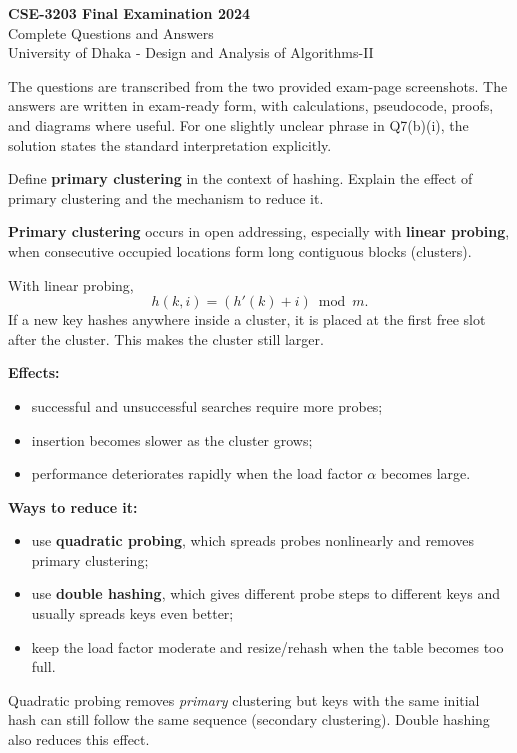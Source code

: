 \documentclass[11pt,a4paper]{article}
\begin{document}
\begin{center}
{\Huge\bfseries\color{primary} CSE-3203 Final Examination 2024}\\[0.25em]
{\Large\color{deepnavy} Complete Questions and Answers}\\[0.25em]
{\small University of Dhaka - Design and Analysis of Algorithms-II}
\end{center}

\begin{pointbox}
The questions are transcribed from the two provided exam-page screenshots. The answers are written in exam-ready form, with calculations, pseudocode, proofs, and diagrams where useful. For one slightly unclear phrase in Q7(b)(i), the solution states the standard interpretation explicitly.
\end{pointbox}

\begin{qaquestion}
Define \textbf{primary clustering} in the context of hashing. Explain the effect of primary clustering and the mechanism to reduce it.
\end{qaquestion}

\begin{qaanswer}[Answer 1(a)]
\textbf{Primary clustering} occurs in open addressing, especially with \textbf{linear probing}, when consecutive occupied locations form long contiguous blocks (clusters).

With linear probing,
\[
h(k,i)=(h'(k)+i)\bmod m.
\]
If a new key hashes anywhere inside a cluster, it is placed at the first free slot after the cluster. This makes the cluster still larger.

\textbf{Effects:}
\begin{itemize}[leftmargin=1.5em]
\item successful and unsuccessful searches require more probes;
\item insertion becomes slower as the cluster grows;
\item performance deteriorates rapidly when the load factor \(\alpha\) becomes large.
\end{itemize}

\textbf{Ways to reduce it:}
\begin{itemize}[leftmargin=1.5em]
\item use \textbf{quadratic probing}, which spreads probes nonlinearly and removes primary clustering;
\item use \textbf{double hashing}, which gives different probe steps to different keys and usually spreads keys even better;
\item keep the load factor moderate and resize/rehash when the table becomes too full.
\end{itemize}

\begin{pointbox}
Quadratic probing removes \emph{primary} clustering but keys with the same initial hash can still follow the same sequence (secondary clustering). Double hashing also reduces this effect.
\end{pointbox}
\end{qaanswer}
\end{document}
